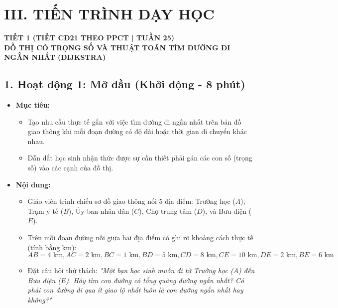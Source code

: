 \documentclass[12pt, a4paper]{article}
\begin{document}
\section*{III. TIẾN TRÌNH DẠY HỌC}

\begin{center}
    \textbf{\large TIẾT 1 (TIẾT CĐ21 THEO PPCT | TUẦN 25)}\\[4pt]
    \textbf{\large ĐỒ THỊ CÓ TRỌNG SỐ VÀ THUẬT TOÁN TÌM ĐƯỜNG ĐI NGẮN NHẤT (DIJKSTRA)}
\end{center}

\subsection*{1. Hoạt động 1: Mở đầu (Khởi động - 8 phút)}

\begin{itemize}[leftmargin=1.2cm]
    \item[a)] \textbf{Mục tiêu:}
    \begin{itemize}[leftmargin=0.6cm]
        \item Tạo nhu cầu thực tế gắn với việc tìm đường đi ngắn nhất trên bản đồ giao thông khi mỗi đoạn đường có độ dài hoặc thời gian di chuyển khác nhau.
        \item Dẫn dắt học sinh nhận thức được sự cần thiết phải gán các con số (trọng số) vào các cạnh của đồ thị.
    \end{itemize}

    \item[b)] \textbf{Nội dung:}
    \begin{itemize}[leftmargin=0.6cm]
        \item Giáo viên trình chiếu sơ đồ giao thông nối 5 địa điểm: Trường học ($A$), Trạm y tế ($B$), Ủy ban nhân dân ($C$), Chợ trung tâm ($D$), và Bưu điện ($E$).
        \item Trên mỗi đoạn đường nối giữa hai địa điểm có ghi rõ khoảng cách thực tế (tính bằng km):
        $$AB = 4\text{ km}, AC = 2\text{ km}, BC = 1\text{ km}, BD = 5\text{ km}, CD = 8\text{ km}, CE = 10\text{ km}, DE = 2\text{ km}, BE = 6\text{ km}$$
        \item Đặt câu hỏi thử thách: \textit{"Một bạn học sinh muốn đi từ Trường học ($A$) đến Bưu điện ($E$). Hãy tìm con đường có tổng quãng đường ngắn nhất? Có phải con đường đi qua ít giao lộ nhất luôn là con đường ngắn nhất hay không?"}
    \end{itemize}


\end{itemize}
\end{document}
